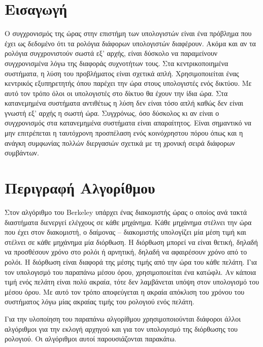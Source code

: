\documentclass{article}
\begin{document}

\tableofcontents
\newpage
\section{Εισαγωγή}
Ο συγχρονισμός της ώρας στην επιστήμη των υπολογιστών είναι ένα πρόβλημα που
έχει ως δεδομένο ότι τα ρολόγια διάφορων υπολογιστών διαφέρουν. Ακόμα και αν
τα ρολόγια συγχρονιστούν σωστά εξ' αρχής, είναι δύσκολο να παραμείνουν
συγχρονισμένα λόγω της διαφοράς συχνοτήτων τους. Στα κεντρικοποιημένα συστήματα,
η λύση του προβλήματος είναι σχετικά απλή. Χρησιμοποιείται ένας κεντρικός
εξυπηρετητής όπου παρέχει την ώρα στους υπολογιστές ενός δικτύου. Με αυτό τον
τρόπο όλοι οι υπολογιστές στο δίκτυο θα έχουν την ίδια ώρα. Στα κατανεμημένα
συστήματα αντιθέτως η λύση δεν είναι τόσο απλή καθώς δεν είναι γνωστή εξ' αρχής η
σωστή ώρα. Συγχρόνως, όσο δύσκολος κι αν είναι ο συγχρονισμός στα κατανεμημένα
συστήματα είναι απαραίτητος. Είναι σημαντικό να μην επιτρέπεται η ταυτόχρονη
προσπέλαση ενός κοινόχρηστου πόρου όπως και η ανάγκη συμφωνίας πολλών διεργασιών
σχετικά με τη χρονική σειρά διάφορων συμβάντων.

\section{Περιγραφή Αλγορίθμου}
Στον αλγόριθμο του Berkeley υπάρχει ένας διακομιστής ώρας ο οποίος ανά τακτά
διαστήματα διενεργεί ελέγχους σε κάθε μηχάνημα. Κάθε μηχάνημα στέλνει την ώρα
που έχει στον διακομιστή, ο δαίμονας -- διακομιστής υπολογίζει μία μέση τιμή και
στέλνει σε κάθε μηχάνημα μία διόρθωση. Η διόρθωση μπορεί να είναι θετική, δηλαδή
να προσθέσουν χρόνο στο ρολόι ή αρνητική, δηλαδή να αφαιρέσουν χρόνο από το
ρολόι. Η διόρθωση είναι διαφορά της μέσης τιμής από την ώρα του κάθε πελάτη. Για
τον υπολογισμό του παραπάνω μέσου όρου, χρησιμοποιείται ένα κατώφλι. Αν κάποια
τιμή ενός πελάτη είναι πολύ ακραία, τότε δεν λαμβάνεται υπόψη στον υπολογισμό
του μέσου όρου. Με αυτό τον τρόπο αποφεύγεται η ακραία απόκλιση του χρόνου του
συστήματος λόγω μίας ακραίας τιμής του ρολογιού ενός πελάτη.

Για την υλοποίηση του παραπάνω αλγορίθμου χρησιμοποιούνται διάφοροι άλλοι
αλγόριθμοι για την εκλογή αρχηγού και για τον υπολογισμό της διόρθωσης του
ρολογιού. Οι αλγόριθμοι αυτοί παρουσιάζονται παρακάτω.
\end{document}
